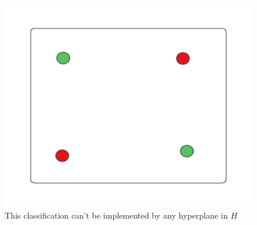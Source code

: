 \begin{figure}[h]
    \centering
    \includegraphics{images/Dichotomy 3.png}
    \caption{This classification can't be implemented by any hyperplane in $H$}
\end{figure}

